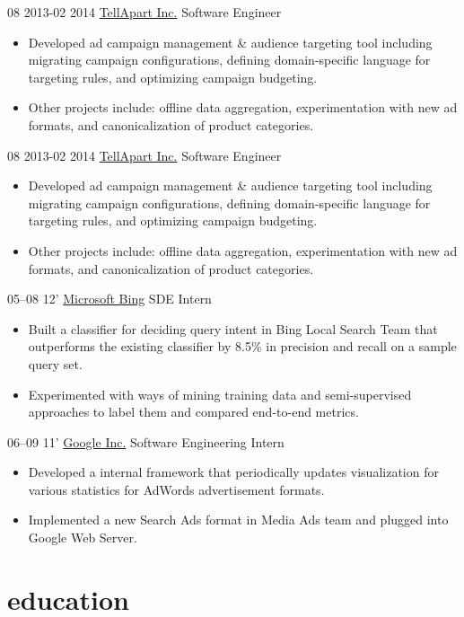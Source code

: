 \documentclass[]{patyoon-cv}
\begin{document}
\begin{entrylist}
  \entry
  {08 2013-02 2014}
  {\href{http://tellapart.com/}{TellApart Inc.}}
  {Software Engineer}
  {\begin{itemize}
    \item Developed ad campaign management & audience targeting tool including migrating campaign configurations, defining domain-specific language for targeting rules, and optimizing campaign budgeting.
    \item Other projects include: offline data aggregation, experimentation with new ad formats, and canonicalization of product categories.
    \end{itemize}
  }
  \entry
  {08 2013-02 2014}
  {\href{http://tellapart.com/}{TellApart Inc.}}
  {Software Engineer}
  {\begin{itemize}
    \item Developed ad campaign management & audience targeting tool including migrating campaign configurations, defining domain-specific language for targeting rules, and optimizing campaign budgeting.
    \item Other projects include: offline data aggregation, experimentation with new ad formats, and canonicalization of product categories.
    \end{itemize}
  }
  \entry
  {05–08 12'}
  {\href{http://bing.com/}{Microsoft Bing}}
  {SDE Intern}
  {\begin{itemize}
    \item Built a classifier for deciding query intent in Bing Local Search Team that outperforms the existing classifier by 8.5\% in precision and recall on a sample query set.
    \item Experimented with ways of mining training data and semi-supervised approaches to label them and compared end-to-end metrics.
    \end{itemize}}
  \entry
  {06–09 11'}
  {\href{http://www.google.com}{Google Inc.}}
  {Software Engineering Intern}
  {\begin{itemize}
    \item Developed a internal framework that periodically updates visualization for various statistics for AdWords advertisement formats.
    \item Implemented a new Search Ads format in Media Ads team and plugged into Google Web Server.
    \end{itemize}}
\end{entrylist}

\section{education}
\end{document}
